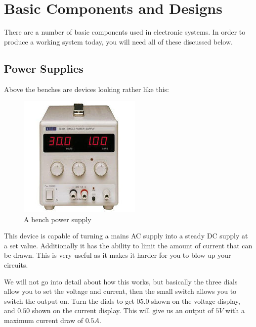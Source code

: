 \section{Basic Components and Designs}
There are a number of basic components used in electronic systems.
In order to produce a working system today, you will need all of these discussed below.

\subsection{Power Supplies}
Above the benches are devices looking rather like this:

\begin{figure}[H]
	\centering
	\includegraphics[width=\textwidth]{./images/bench.jpg}
	\caption{A bench power supply}
	\label{fig:benchsupply}
\end{figure}

This device is capable of turning a mains AC supply into a steady DC supply at a set value.
Additionally it has the ability to limit the amount of current that can be drawn.
This is very useful as it makes it harder for you to blow up your circuits.

We will not go into detail about how this works, but basically the three dials allow you to set the voltage and current, then the small switch allows you to switch the output on.
Turn the dials to get $05.0$ shown on the voltage display, and $0.50$ shown on the current display.
This will give us an output of $5V$ with a maximum current draw of $0.5A$.

